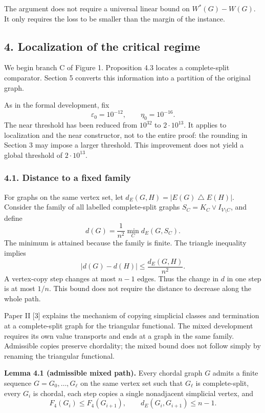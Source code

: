 \documentclass[english,11pt,a4paper]{article}
\begin{document}
The argument does not require a universal linear bound on \(W^*(G)-W(G)\). It only requires the loss to be smaller than the margin of the instance.

\subsection{4. Localization of the critical regime}\label{localization-of-the-critical-regime}

We begin branch C of Figure 1. Proposition 4.3 locates a complete-split comparator. Section 5 converts this information into a partition of the original graph.

As in the formal development, fix \[
\varepsilon_0=10^{-12},\qquad \eta_0=10^{-16}.
\tag{4.1}
\] The near threshold has been reduced from \(10^{32}\) to \(2\cdot10^{13}\). It applies to localization and the near constructor, not to the entire proof: the rounding in Section 3 may impose a larger threshold. This improvement does not yield a global threshold of \(2\cdot10^{13}\).

\subsubsection{4.1. Distance to a fixed family}\label{distance-to-a-fixed-family}

For graphs on the same vertex set, let \(d_E(G,H)=|E(G)\mathbin{\triangle}E(H)|\). Consider the family of all labelled complete-split graphs \(S_C=K_C\vee I_{V\setminus C}\), and define \[
d(G)=\frac1{n^2}\min_C d_E(G,S_C).
\] The minimum is attained because the family is finite. The triangle inequality implies \[
|d(G)-d(H)|\le\frac{d_E(G,H)}{n^2}.
\tag{4.2}
\] A vertex-copy step changes at most \(n-1\) edges. Thus the change in \(d\) in one step is at most \(1/n\). This bound does not require the distance to decrease along the whole path.

Paper II {[}3{]} explains the mechanism of copying simplicial classes and termination at a complete-split graph for the triangular functional. The mixed development requires its own value transports and ends at a graph in the same family. Admissible copies preserve chordality; the mixed bound does not follow simply by renaming the triangular functional.


\textbf{Lemma 4.1 (admissible mixed path).} Every chordal graph \(G\) admits a finite sequence \(G=G_0,\ldots,G_\ell\) on the same vertex set such that \(G_\ell\) is complete-split, every \(G_i\) is chordal, each step copies a single nonadjacent simplicial vertex, and \[
F_4(G_i)\le F_4(G_{i+1}),\qquad
d_E(G_i,G_{i+1})\le n-1.
\tag{4.3}
\]
\end{document}
